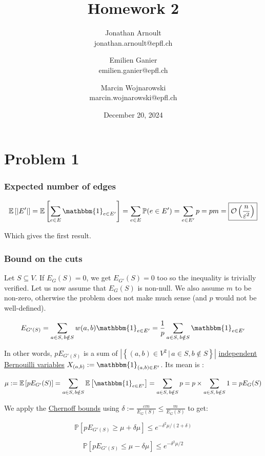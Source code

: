 \documentclass[a4paper, 11pt]{article}
\title{Homework 2}
\author{
    Jonathan Arnoult \\ jonathan.arnoult@epfl.ch
    \and Emilien Ganier \\ emilien.ganier@epfl.ch
    \and Marcin Wojnarowski \\ marcin.wojnarowski@epfl.ch
}
\date{December 20, 2024}
\begin{document}
\maketitle

\section*{Problem 1}

\subsubsection*{Expected number of edges}

$$\mathbb{E}\left[|E'|\right] = \mathbb{E}\left[\sum_{e\in E}\mathbbm{1}_{e \in E'}\right] = \sum_{e\in E}\mathbb{P}(e \in E') = \sum_{e \in E'}p = pm = \boxed{\mathcal{O}\left(\frac{n}{\varepsilon^2}\right)}$$

Which gives the first result.

\subsubsection*{Bound on the cuts}

Let $S \subseteq V$. If $E_G(S) = 0$, we get $E_{G'}(S) = 0$ too so the inequality is trivially verified. Let us now assume that $E_G(S)$ is non-null. We also assume $m$ to be non-zero, otherwise the problem does not make much sense (and $p$ would not be well-defined).

$$E_{G'(S)} = \sum_{a \in S,\, b \notin S} w(a, b) \mathbbm{1}_{e \in E'} = \frac{1}{p} \sum_{a \in S,\, b \notin S} \mathbbm{1}_{e \in E'}$$

In other words, $p E_{G'(S)}$ is a sum of $|\left\{(a, b) \in V^2 \,|\, a \in S, b \notin S\right\}|$ \ul{independent Bernouilli variables} $X_{(a,b)} := \mathbbm{1}_{(a,b) \in E'}$. Its mean is :

$$\mu := \mathbb{E}\left[ p E_{G'}(S) \right] = \sum_{a \in S,\, b \notin S} \mathbb{E}\left[\mathbbm{1}_{e \in E'}\right] = \sum_{a \in S,\, b \notin S} p = p \times \sum_{a \in S,\, b \notin S} 1 = p E_G(S)$$

We apply the \ul{Chernoff bounds} using $\delta := \frac{\varepsilon m}{E_G(S)} \le \frac{m}{E_G(S)}$ to get:

$$\mathbb{P}\left[p E_{G'(S)} \ge \mu + \delta \mu\right] \le e^{-\delta^2\mu/(2+\delta)}$$

$$\mathbb{P}\left[p E_{G'(S)} \le \mu - \delta \mu\right] \le e^{-\delta^2\mu/2}$$
\end{document}
